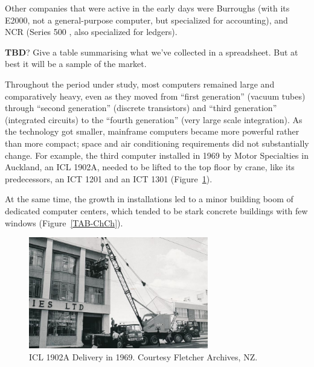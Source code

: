\documentclass{IEEEcsmag}
\begin{document}
Other companies that were active in the early days were Burroughs (with its E2000, not a general-purpose computer, but specialized for accounting), and NCR (Series 500 , also specialized for ledgers).

{\bf TBD}? Give a table summarising what we've collected in a spreadsheet. But at best it will be a sample of the market.

Throughout the period under study, most computers remained large and comparatively heavy, even as they moved from ``first generation'' (vacuum tubes) through ``second generation'' (discrete transistors) and ``third generation'' (integrated circuits) to the ``fourth generation'' (very large scale integration). As the technology got smaller, mainframe computers became more powerful rather than more compact; space and air conditioning requirements did not substantially change. For example, the third computer installed in 1969 by Motor Specialties in Auckland, an ICL 1902A, needed to be lifted to the top floor by crane, like its predecessors, an ICT 1201 and an ICT 1301 (Figure~\ref{MS1902A}).

At the same time, the growth in installations led to a minor building boom of dedicated computer centers, which tended to be stark concrete buildings with few windows (Figure~\ref{TAB-ChCh}).

\begin{figure}
\centerline{\includegraphics[width=18.5pc]{MotorSpec1902A-1969.jpg}}
\caption{\label{MS1902A}ICL 1902A Delivery in 1969. Courtesy Fletcher Archives, NZ.}\vspace*{-5pt}
\end{figure}
\end{document}
